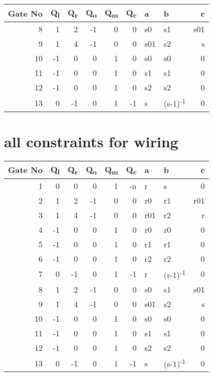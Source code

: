 \documentclass[11pt]{article}
\begin{document}
\begin{center}
\begin{tabular}{rrrrrrllr}
Gate No & Q\textsubscript{l} & Q\textsubscript{r} & Q\textsubscript{o} & Q\textsubscript{m} & Q\textsubscript{c} & a & b & c\\[0pt]
\hline
8 & 1 & 2 & -1 & 0 & 0 & s0 & s1 & s01\\[0pt]
9 & 1 & 4 & -1 & 0 & 0 & s01 & s2 & s\\[0pt]
10 & -1 & 0 & 0 & 1 & 0 & s0 & s0 & 0\\[0pt]
11 & -1 & 0 & 0 & 1 & 0 & s1 & s1 & 0\\[0pt]
12 & -1 & 0 & 0 & 1 & 0 & s2 & s2 & 0\\[0pt]
13 & 0 & -1 & 0 & 1 & -1 & s & (s-1)\textsuperscript{-1} & 0\\[0pt]
\hline
\end{tabular}
\end{center}

\section{all constraints for wiring}
\label{sec:org582ca25}
\begin{center}
\begin{tabular}{rrrrrrllr}
Gate No & Q\textsubscript{l} & Q\textsubscript{r} & Q\textsubscript{o} & Q\textsubscript{m} & Q\textsubscript{c} & a & b & c\\[0pt]
\hline
1 & 0 & 0 & 0 & 1 & -n & r & s & 0\\[0pt]
2 & 1 & 2 & -1 & 0 & 0 & r0 & r1 & r01\\[0pt]
3 & 1 & 4 & -1 & 0 & 0 & r01 & r2 & r\\[0pt]
4 & -1 & 0 & 0 & 1 & 0 & r0 & r0 & 0\\[0pt]
5 & -1 & 0 & 0 & 1 & 0 & r1 & r1 & 0\\[0pt]
6 & -1 & 0 & 0 & 1 & 0 & r2 & r2 & 0\\[0pt]
7 & 0 & -1 & 0 & 1 & -1 & r & (r-1)\textsuperscript{-1} & 0\\[0pt]
8 & 1 & 2 & -1 & 0 & 0 & s0 & s1 & s01\\[0pt]
9 & 1 & 4 & -1 & 0 & 0 & s01 & s2 & s\\[0pt]
10 & -1 & 0 & 0 & 1 & 0 & s0 & s0 & 0\\[0pt]
11 & -1 & 0 & 0 & 1 & 0 & s1 & s1 & 0\\[0pt]
12 & -1 & 0 & 0 & 1 & 0 & s2 & s2 & 0\\[0pt]
13 & 0 & -1 & 0 & 1 & -1 & s & (s-1)\textsuperscript{-1} & 0\\[0pt]
\hline
\end{tabular}
\end{center}
\end{document}
